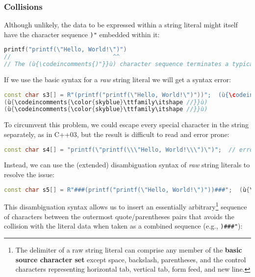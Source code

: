 \subsubsection[Collisions]{Collisions}\label{collisions}

Although unlikely, the data to be expressed within a
string literal might itself have the character sequence \texttt{)"}
embedded within it:

\begin{lstlisting}[language=C++]
printf("printf(\"Hello, World!\")")
//                             ^^
// The (ù{\codeincomments{)"}}ù) character sequence terminates a typical raw string literal.
\end{lstlisting}

\noindent If we use the basic syntax for a \emph{raw} string literal we will get a
syntax error:

\begin{lstlisting}[language=C++,]
const char s3[] = R"(printf("printf(\"Hello, World!\")"))";  (ù{\codeincomments{\color{skyblue}\ttfamily\itshape // collision}}ù)
(ù{\codeincomments{\color{skyblue}\ttfamily\itshape //}}ù)                                                    (ù{\codeincomments{\color{skyblue}\ttfamily\itshape\textasciicircum\textasciicircum}}ù)
(ù{\codeincomments{\color{skyblue}\ttfamily\itshape //}}ù)                       (ù{\codeincomments{\color{skyblue}\ttfamily\itshape Syntax error after literal ends}}ù)
\end{lstlisting}

\noindent To circumvent this problem, we could escape every special character in
the string separately, as in C++03, but the result is difficult to read
and error prone:

\begin{lstlisting}[language=C++]
const char s4[] = "printf(\"printf(\\\"Hello, World!\\\")\")";  // error prone
\end{lstlisting}

\noindent Instead, we can use the (extended) disambiguation syntax of \emph{raw}
string literals to resolve the issue:

\begin{lstlisting}[language=C++]
const char s5[] = R"###(printf("printf(\"Hello, World!\")"))###";  (ù{\codeincomments{\color{skyblue}\ttfamily\itshape // cleaner}}ù)
\end{lstlisting}

\noindent This disambiguation syntax allows us to insert an essentially
arbitrary{\cprotect\footnote{The delimiter of a raw string literal can
comprise any member of the \textbf{basic source character set} except
space, backslash, parentheses, and the control characters representing
  horizontal tab, vertical tab, form feed, and new line.}} sequence of
characters between the outermost quote/parentheses pairs that avoids the
collision with the literal data when taken as a combined sequence (e.g.,
\texttt{)\#\#\#"}):


